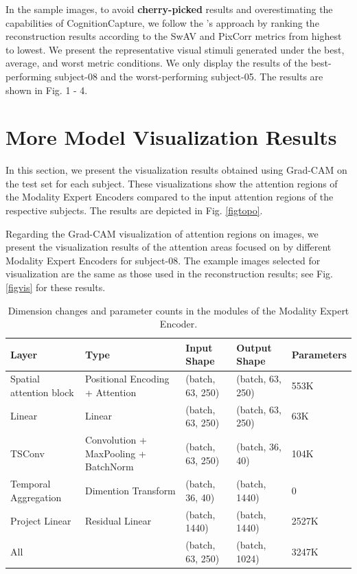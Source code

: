 \documentclass[letterpaper]{article} %
\begin{document}
In the sample images, to avoid \textbf{cherry-picked} results and overestimating the capabilities of CognitionCapture, we follow the \cite{benchetrit2024braindecodingrealtimereconstruction}'s approach by ranking the reconstruction results according to the SwAV and PixCorr metrics from highest to lowest. We present the representative visual stimuli generated under the best, average, and worst metric conditions. We only display the results of the best-performing subject-08 and the worst-performing subject-05. The results are shown in Fig. 1 - 4. 

\section{More Model Visualization Results}

In this section, we present the visualization results obtained using Grad-CAM\cite{selvaraju2017grad} on the test set for each subject. These visualizations show the attention regions of the Modality Expert Encoders compared to the input attention regions of the respective subjects. The results are depicted in Fig. \ref{figtopo}. 

Regarding the Grad-CAM visualization of attention regions on images, we present the visualization results of the attention areas focused on by different Modality Expert Encoders for subject-08. The example images selected for visualization are the same as those used in the reconstruction results; see Fig. \ref{figvis}  for these results.

\begin{table}[ht]
\centering
\begin{tabular}{lllll}
\hline
Layer & Type & Input Shape & Output Shape & Parameters \\ \hline
Spatial attention block & Positional Encoding + Attention & (batch, 63, 250) & (batch, 63, 250) & 553K \\
Linear & Linear & (batch, 63, 250) & (batch, 63, 250) & 63K \\
TSConv & Convolution + MaxPooling + BatchNorm & (batch, 63, 250) & (batch, 36, 40) & 104K \\
Temporal Aggregation & Dimention Transform & (batch, 36, 40) & (batch, 1440) & 0 \\
Project Linear & Residual Linear & (batch, 1440) & (batch, 1440) & 2527K \\ \hline
All &  & (batch, 63, 250) & (batch, 1024) & 3247K \\ \hline
\end{tabular}
\caption{Dimension changes and parameter counts in the modules of the Modality Expert Encoder. }
\label{dimparam}
\end{table}
\end{document}
